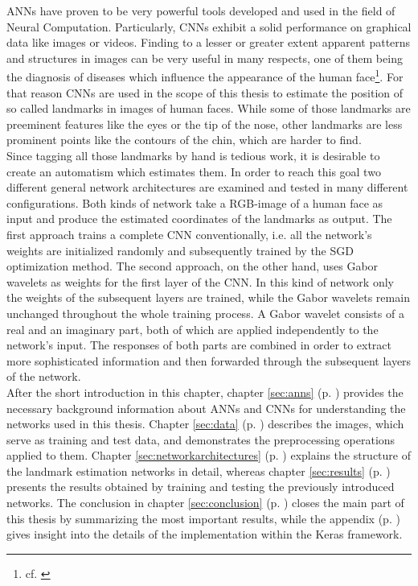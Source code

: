 \documentclass[11pt, a4paper]{article}
\newcommand\myref[1]{\ref{#1} (p. \pageref{#1})}
\begin{document}
\acp{ANN} have proven to be very powerful tools developed and used in the field of Neural Computation. Particularly, \acp{CNN} exhibit a solid performance on graphical data like images or videos. Finding to a lesser or greater extent apparent patterns and structures in images can be very useful in many respects, one of them being the diagnosis of diseases which influence the appearance of the human face\footnote{cf. \cite{ebgm}}. For that reason \acp{CNN} are used in the scope of this thesis to estimate the position of so called landmarks in images of human faces. While some of those landmarks are preeminent features like the eyes or the tip of the nose, other landmarks are less prominent points like the contours of the chin, which are harder to find.\\
Since tagging all those landmarks by hand is tedious work, it is desirable to create an automatism which estimates them. In order to reach this goal two different general network architectures are examined and tested in many different configurations. Both kinds of network take a \ac{RGB}-image of a human face as input and produce the estimated coordinates of the landmarks as output. The first approach trains a complete \ac{CNN} conventionally, i.e. all the network's weights are initialized randomly and subsequently trained by the \ac{SGD} optimization method. The second approach, on the other hand, uses Gabor wavelets as weights for the first layer of the \ac{CNN}. In this kind of network only the weights of the subsequent layers are trained, while the Gabor wavelets remain unchanged throughout the whole training process. A Gabor wavelet consists of a real and an imaginary part, both of which are applied independently to the network's input. The responses of both parts are combined in order to extract more sophisticated information and then forwarded through the subsequent layers of the network.\\
After the short introduction in this chapter, chapter \myref{sec:anns} provides the necessary background information about \acp{ANN} and \acp{CNN} for understanding the networks used in this thesis. Chapter \myref{sec:data} describes the images, which serve as training and test data, and demonstrates the preprocessing operations applied to them. Chapter \myref{sec:networkarchitectures} explains the structure of the landmark estimation networks in detail, whereas chapter \myref{sec:results} presents the results obtained by training and testing the previously introduced networks. The conclusion in chapter \myref{sec:conclusion} closes the main part of this thesis by summarizing the most important results, while the appendix (p. \pageref{appendix}) gives insight into the details of the implementation within the Keras framework.
\end{document}
